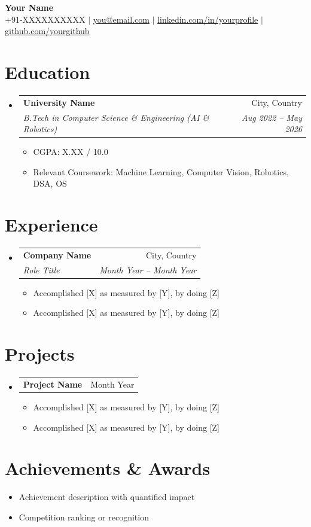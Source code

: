 \documentclass[11pt, letterpaper]{article}
\makeatletter
\newcommand{\resumeEntry}[4]{
  \vspace{-2pt}\item
    \begin{tabular*}{0.97\textwidth}[t]{l@{\extracolsep{\fill}}r}
      \textbf{#1} & #2 \\
      \textit{\small#3} & \textit{\small #4} \\
    \end{tabular*}\vspace{-7pt}
}
\newcommand{\resumeSubEntry}[2]{
  \vspace{-2pt}\item
    \begin{tabular*}{0.97\textwidth}[t]{l@{\extracolsep{\fill}}r}
      \textbf{#1} & #2 \\
    \end{tabular*}\vspace{-7pt}
}
\newcommand{\resumeItemListStart}{\begin{itemize}[leftmargin=0.15in, label=\textbullet]}
\newcommand{\resumeItemListEnd}{\end{itemize}\vspace{-5pt}}
\newcommand{\resumeItem}[1]{\item\small{#1 \vspace{-2pt}}}
\newcommand{\resumeEntryListStart}{\begin{itemize}[leftmargin=0.0in, label={}]}
\newcommand{\resumeEntryListEnd}{\end{itemize}}
\makeatother
\begin{document}
\raggedright

\begin{center}
  {\Huge \textbf{Your Name}} \\[4pt]
  \small
  +91-XXXXXXXXXX $|$
  \href{mailto:you@email.com}{you@email.com} $|$
  \href{https://linkedin.com/in/yourprofile}{linkedin.com/in/yourprofile} $|$
  \href{https://github.com/yourgithub}{github.com/yourgithub}
\end{center}

\section{Education}
\resumeEntryListStart
  \resumeEntry
    {University Name}{City, Country}
    {B.Tech in Computer Science \& Engineering (AI \& Robotics)}{Aug 2022 -- May 2026}
    \resumeItemListStart
      \resumeItem{CGPA: X.XX / 10.0}
      \resumeItem{Relevant Coursework: Machine Learning, Computer Vision, Robotics, DSA, OS}
    \resumeItemListEnd
\resumeEntryListEnd

\section{Experience}
\resumeEntryListStart
  \resumeEntry
    {Company Name}{City, Country}
    {Role Title}{Month Year -- Month Year}
    \resumeItemListStart
      \resumeItem{Accomplished [X] as measured by [Y], by doing [Z]}
      \resumeItem{Accomplished [X] as measured by [Y], by doing [Z]}
    \resumeItemListEnd
\resumeEntryListEnd

\section{Projects}
\resumeEntryListStart
  \resumeSubEntry{Project Name}{Month Year}
  \resumeItemListStart
    \resumeItem{Accomplished [X] as measured by [Y], by doing [Z]}
    \resumeItem{Accomplished [X] as measured by [Y], by doing [Z]}
  \resumeItemListEnd
\resumeEntryListEnd

\section{Achievements \& Awards}
\resumeItemListStart
  \resumeItem{Achievement description with quantified impact}
  \resumeItem{Competition ranking or recognition}
\resumeItemListEnd
\end{document}
